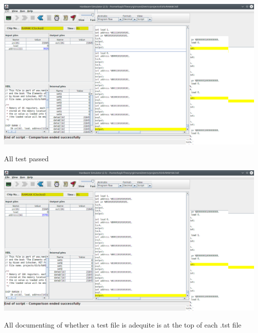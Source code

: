 \documentclass[titlepage]{article}
\begin{document}
\begin{enumerate}
{\begin{description}
{        \includegraphics[width=.9\textwidth]{b/RAM4K.png}
      }
      \item[RAM16K]{
        All test passed

        \includegraphics[width=.9\textwidth]{b/RAM16K.png}
      }
    \end{description}
  }
\end{enumerate}

All documenting of whether a test file is adequite is at the top of each .tst file
\end{document}
